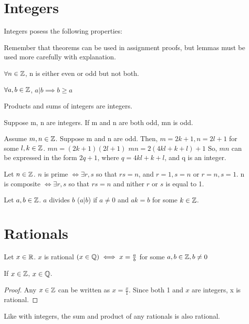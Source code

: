 \documentclass{article}
\begin{document}
\section{Integers}

Integers posess the following properties:
\par 
Remember that theorems can be used in assignment proofs, but lemmas
must be used more carefully with explanation.
\begin{th}
    $\forall n \in \mathbb{Z} $, n is either even or odd but not both.
\end{th}
\begin{th}
    $\forall a,b \in \mathbb{Z}$, $ a|b\implies b\geq a$
\end{th}
\begin{th}
    Products and sums of integers are integers.
\end{th}

\begin{le}
    Suppose m, n are integers. If m and n are both odd, mn is odd.
\end{le}
\begin{pf}
    Assume $m, n \in \mathbb{Z}$.
    Suppose m and n are odd. 
    \newline
    Then, $m = 2k+1, n = 2l+1$ for some
     $l, k \in \mathbb{Z}$.
    \newline
    $mn = (2k+1)(2l+1)$\newline
    $mn = 2(4kl + k + l) + 1$\newline
    So, $mn$ can be expressed in the form $2q+1$, where $q = 4kl + k +l$, and q is an integer.
\end{pf}
\begin{df}
    Let $n \in \mathbb{Z}$.\newline
    $n$ is prime $\iff \exists r,s $ so that $rs = n$, and $r = 1, s=n$ or $r=n, s =1$. \newline
    n is composite $\iff \exists r,s $ so that $rs =n$ and nither $r$ or $s$ is 
    equal to 1.
\end{df}
\begin{df}
    Let $a,b \in \mathbb{Z}$. $a$ divides $b$ ($a|b$) if $a\neq 0$ and $ak = b$
    for some $k \in \mathbb{Z}$.
\end{df}

\section{Rationals}
\begin{df}
    Let $x \in \mathbb{R}$. $x$ is rational $(x \in \mathbb{Q}) \iff x = \frac{a}{b}$ for some
    $a,b \in \mathbb{Z}, b\neq 0$
\end{df}
\begin{le}
    If $x \in \mathbb{Z}$, $x \in \mathbb{Q}$.
    \begin{proof}
        Any $x \in \mathbb{Z}$ can be written as $x=\frac{x}{1}$. Since both 1 and $x$
        are integers, x is rational.
    \end{proof}
\end{le}
\begin{le}
    Like with integers, the sum and product of any rationals is also rational.
\end{le}
\end{document}
